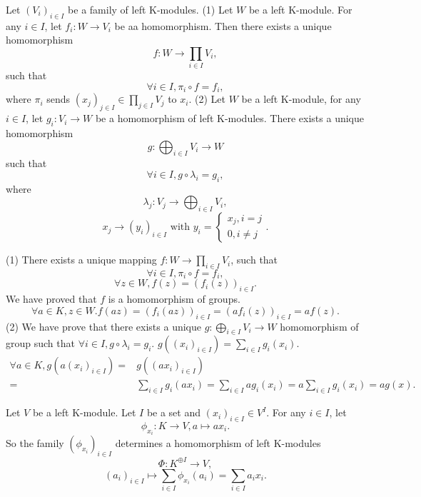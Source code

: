 \begin{propositionenv}
    Let $(V_i)_{i\in I}$ be a family of left K-modules.
    \newline
    (1) Let $W$ be a left K-module. For any $i\in I$,  let $f_i:W\rightarrow V_i$ be aa homomorphism. Then there exists a unique homomorphism 
    $$f:W\longrightarrow \prod_{i\in I}V_i, $$ 
    such that 
    $$\forall i\in I, \pi_i\circ f=f_i, $$
    where $\pi_i$ sends $(x_j)_{j\in I}\in \prod_{j\in I}V_j$ to $x_i$.
    \newline
    (2) Let $W$ be a left K-module,  for any $i\in I$,  let $g_i:V_i\rightarrow W$ be a homomorphism of left K-modules. There exists a unique homomorphism
    $$g:\bigoplus_{i\in I}V_i\longrightarrow W$$
    such that 
    $$\forall i\in I,  g\circ\lambda_i=g_i, $$
    where
    $$\lambda_j:V_j\longrightarrow\bigoplus_{i\in I}V_i, $$
    $$x_j\longrightarrow (y_i)_{i\in I} \text{ with } y_i=\left\{\begin{matrix}
        x_j, i=j\\0, i\not=j
    \end{matrix}\right. .$$
\end{propositionenv}
\begin{proofenv}
    \quad
    \newline
    (1) There exists a unique mapping $f:W\rightarrow \prod_{i\in I}V_i$,  such that 
    $$\forall i\in I, \pi_i\circ f=f_i, $$
    $$\forall z\in W, f(z)=(f_i(z))_{i\in I}.$$
    We have proved that $f$ is a homomorphism of groups.
    $$\forall a\in K, z\in W. f(az)=(f_i(az))_{i\in I}=(af_i(z))_{i\in I}=af(z).$$
    (2) We have prove that there exists a unique $g:\bigoplus_{i\in I}V_i\rightarrow W$ homomorphism of group such that $\forall i\in I,  g\circ \lambda_i=g_i.$ $g\left((x_i)_{i\in I}\right)=\sum_{i\in I}g_i(x_i)$.
    \begin{align*}
        \forall a\in K, g\left(a(x_i)_{i\in I}\right)=&g\left((ax_i)_{i\in I}\right)\\
        =&\sum_{i\in I}g_i(ax_i)=\sum_{i\in I}ag_i(x_i)
        =a\sum_{i\in I}g_i(x_i)=ag(x).
    \end{align*}
\end{proofenv}
\begin{applicationenv}
Let $V$ be a left K-module. Let $I$ be a set and $(x_i)_{i\in I}\in V^{I}$. For any $i\in I$,  let 
$$\phi_{x_i}:K\longrightarrow V, a\mapsto ax_i.$$ 
So the family $(\phi_{x_i})_{i\in I}$ determines a homomorphism of left K-modules 
$$\Phi:K^{\oplus I}\longrightarrow V, $$
$$(a_i)_{i\in I}\longmapsto \sum_{i\in I}\phi_{x_i}(a_i)=\sum_{i\in I}a_ix_i.$$
\end{applicationenv}

